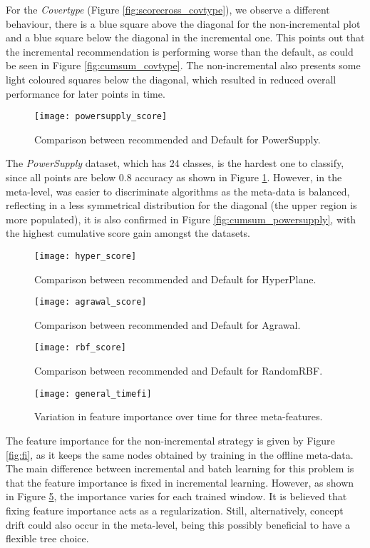 For the \textit{Covertype} (Figure \ref{fig:scorecross_covtype}), we observe a different behaviour, there is a blue square above the diagonal for the non-incremental plot and a blue square below the diagonal in the incremental one. This points out that the incremental recommendation is performing worse than the default, as could be seen in Figure \ref{fig:cumsum_covtype}. The non-incremental also presents some light coloured squares below the diagonal, which resulted in reduced overall performance for later points in time.

\begin{figure}[!t]
    \centering
    \texttt{[image: powersupply\_score]}
    \caption{Comparison between recommended and Default for PowerSupply.}
    \label{fig:scorecross_powersupply}
\end{figure}

The \textit{PowerSupply} dataset, which has 24 classes, is the hardest one to classify, since all points are below 0.8 accuracy as shown in Figure \ref{fig:scorecross_powersupply}. However, in the meta-level, was easier to discriminate algorithms as the meta-data is balanced, reflecting in a less symmetrical distribution for the diagonal (the upper region is more populated), it is also confirmed in Figure \ref{fig:cumsum_powersupply}, with the highest cumulative score gain amongst the datasets.

\begin{figure}[!t]
    \centering
    \texttt{[image: hyper\_score]}
    \caption{Comparison between recommended and Default for HyperPlane.}
    \label{fig:scorecross_hyper}
\end{figure}

\begin{figure}[!t]
    \centering
    \texttt{[image: agrawal\_score]}
    \caption{Comparison between recommended and Default for Agrawal.}
    \label{fig:scorecross_agrawal}
\end{figure}

\begin{figure}[!t]
    \centering
    \texttt{[image: rbf\_score]}
    \caption{Comparison between recommended and Default for RandomRBF.}
    \label{fig:scorecross_rbf}
\end{figure}


\begin{figure}[!t]
    \centering
    \texttt{[image: general\_timefi]}
    \caption{Variation in feature importance over time for three meta-features.}
    \label{fig:fi_time}
\end{figure}

The feature importance for the non-incremental strategy is given by Figure \ref{fig:fi}, as it keeps the same nodes obtained by training in the offline meta-data. The main difference between incremental and batch learning for this problem is that the feature importance is fixed in incremental learning. However, as shown in Figure \ref{fig:fi_time}, the importance varies for each trained window. It is believed that fixing feature importance acts as a regularization. Still, alternatively, concept drift could also occur in the meta-level, being this possibly beneficial to have a flexible tree choice.